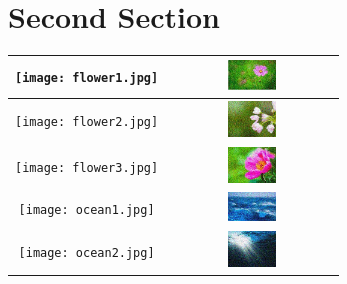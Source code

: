 \documentclass[12pt,a4paper]{article}%
\begin{document}
%
\section{Second Section}%
\label{sec:SecondSection}%


\begin{table}[ht]%
\begin{center}%
\begin{tabular}{|c|c|}%
\hline%
\texttt{[image: flower1.jpg]}&\includegraphics[width=0.3\textwidth]{outputs/155/flower1.jpg}\\%
\hline%
\texttt{[image: flower2.jpg]}&\includegraphics[width=0.3\textwidth]{outputs/155/flower2.jpg}\\%
\hline%
\texttt{[image: flower3.jpg]}&\includegraphics[width=0.3\textwidth]{outputs/155/flower3.jpg}\\%
\hline%
\texttt{[image: ocean1.jpg]}&\includegraphics[width=0.3\textwidth]{outputs/155/ocean1.jpg}\\%
\hline%
\texttt{[image: ocean2.jpg]}&\includegraphics[width=0.3\textwidth]{outputs/155/ocean2.jpg}\\%

\end{tabular}
\end{center}
\end{table}
\end{document}
